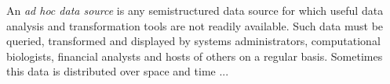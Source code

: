 An {\em ad hoc data source} is any semistructured data source for
which useful data analysis and transformation tools are not 
readily available.  Such data must be queried, transformed and displayed by
systems administrators, computational biologists, financial analysts
and hosts of others on a regular basis.  
Sometimes this data is distributed over space and time ...